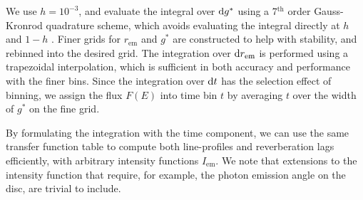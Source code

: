 We use $h = 10^{-3}$, and evaluate the integral over $\text{d} g^\ast$ using a 7$^\text{th}$ order Gauss-Kronrod quadrature scheme, which avoids evaluating the integral directly at $h$ and $1 - h$ \citep{}. Finer grids for $r_\text{em}$ and $g^\ast$ are constructed to help with stability, and rebinned into the desired grid. The integration over $\text{d} r_\text{em}$ is performed using a trapezoidal interpolation, which is sufficient in both accuracy and performance with the finer bins. Since the integration over $\text{d} t$ has the selection effect of binning, we assign the flux $F(E)$ into time bin $t$ by averaging $t$ over the width of $g^\ast$ on the fine grid.

By formulating the integration with the time component, we can use the same transfer function table to compute both line-profiles and reverberation lags efficiently, with arbitrary intensity functions $I_\text{em}$. We note that extensions to the intensity function that require, for example, the photon emission angle on the disc, are trivial to include.

